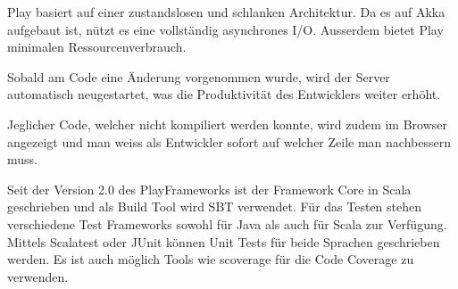 Play basiert auf einer zustandslosen und schlanken Architektur. Da es auf Akka aufgebaut ist, nützt es eine vollständig asynchrones I/O. Ausserdem bietet Play minimalen Ressourcenverbrauch. 

Sobald am Code eine Änderung vorgenommen wurde, wird der Server automatisch neugestartet, was die Produktivität des Entwicklers  weiter erhöht.

Jeglicher Code, welcher nicht kompiliert werden konnte, wird zudem im Browser angezeigt und man weiss als Entwickler sofort auf welcher Zeile man nachbessern muss. 

Seit der Version 2.0 des PlayFrameworks ist der Framework Core in Scala geschrieben und als Build Tool wird SBT verwendet. Für das Testen stehen verschiedene Test Frameworks sowohl für Java als auch für Scala zur Verfügung. Mittels Scalatest oder JUnit können Unit Tests für beide Sprachen geschrieben werden. Es ist auch möglich Tools wie scoverage für die Code Coverage zu verwenden. 
